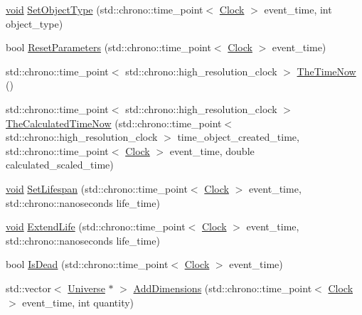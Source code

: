 \begin{DoxyCompactItemize}
\item 
\mbox{\hyperlink{glad_8h_a950fc91edb4504f62f1c577bf4727c29}{void}} \mbox{\hyperlink{class_universe_a2274a54fbdc7504c897e4272162bf17a}{Set\+Object\+Type}} (std\+::chrono\+::time\+\_\+point$<$ \mbox{\hyperlink{universe_8h_a0ef8d951d1ca5ab3cfaf7ab4c7a6fd80}{Clock}} $>$ event\+\_\+time, int object\+\_\+type)
\item 
bool \mbox{\hyperlink{class_universe_a1d92b2277564577571c802f6e0c206dd}{Reset\+Parameters}} (std\+::chrono\+::time\+\_\+point$<$ \mbox{\hyperlink{universe_8h_a0ef8d951d1ca5ab3cfaf7ab4c7a6fd80}{Clock}} $>$ event\+\_\+time)
\item 
std\+::chrono\+::time\+\_\+point$<$ std\+::chrono\+::high\+\_\+resolution\+\_\+clock $>$ \mbox{\hyperlink{class_universe_ae54d34c5d695917e074b8e07e8820bdb}{The\+Time\+Now}} ()
\item 
std\+::chrono\+::time\+\_\+point$<$ std\+::chrono\+::high\+\_\+resolution\+\_\+clock $>$ \mbox{\hyperlink{class_universe_aa220508c4cc12b02c6fe494622ebb58d}{The\+Calculated\+Time\+Now}} (std\+::chrono\+::time\+\_\+point$<$ std\+::chrono\+::high\+\_\+resolution\+\_\+clock $>$ time\+\_\+object\+\_\+created\+\_\+time, std\+::chrono\+::time\+\_\+point$<$ \mbox{\hyperlink{universe_8h_a0ef8d951d1ca5ab3cfaf7ab4c7a6fd80}{Clock}} $>$ event\+\_\+time, double calculated\+\_\+scaled\+\_\+time)
\item 
\mbox{\hyperlink{glad_8h_a950fc91edb4504f62f1c577bf4727c29}{void}} \mbox{\hyperlink{class_universe_ac3443dd59b61ae3110f07f681f63ed0a}{Set\+Lifespan}} (std\+::chrono\+::time\+\_\+point$<$ \mbox{\hyperlink{universe_8h_a0ef8d951d1ca5ab3cfaf7ab4c7a6fd80}{Clock}} $>$ event\+\_\+time, std\+::chrono\+::nanoseconds life\+\_\+time)
\item 
\mbox{\hyperlink{glad_8h_a950fc91edb4504f62f1c577bf4727c29}{void}} \mbox{\hyperlink{class_universe_a982502e46868a00a9111738ccc9355c2}{Extend\+Life}} (std\+::chrono\+::time\+\_\+point$<$ \mbox{\hyperlink{universe_8h_a0ef8d951d1ca5ab3cfaf7ab4c7a6fd80}{Clock}} $>$ event\+\_\+time, std\+::chrono\+::nanoseconds life\+\_\+time)
\item 
bool \mbox{\hyperlink{class_universe_a8fdaa6d06584e1ef50c4c613b22b786e}{Is\+Dead}} (std\+::chrono\+::time\+\_\+point$<$ \mbox{\hyperlink{universe_8h_a0ef8d951d1ca5ab3cfaf7ab4c7a6fd80}{Clock}} $>$ event\+\_\+time)
\item 
std\+::vector$<$ \mbox{\hyperlink{class_universe}{Universe}} $\ast$ $>$ \mbox{\hyperlink{class_universe_a03bdf5f7fea4209241e9bf5316d45517}{Add\+Dimensions}} (std\+::chrono\+::time\+\_\+point$<$ \mbox{\hyperlink{universe_8h_a0ef8d951d1ca5ab3cfaf7ab4c7a6fd80}{Clock}} $>$ event\+\_\+time, int quantity)

\end{DoxyCompactItemize}
